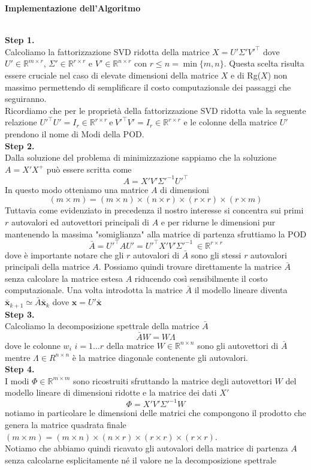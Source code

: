 \documentclass[11pt]{article}
\newcommand{\R}{\mathbb{R}} %
\begin{document}
\begin{large}{\textbf{Implementazione dell'Algoritmo}}\end{large}\\
\textbf{Step 1.}\\
Calcoliamo la fattorizzazione SVD ridotta della matrice $X=U'\Sigma' V'^\top$ dove $U' \in \R^{m \times r}$, $\Sigma' \in \R^{r \times r}$ e $V' \in \R^{n \times r}$ con $r \leq n = \min{\{m,n\}} $.  Questa scelta risulta essere cruciale  nel caso di elevate dimensioni della matrice $X$ e di Rg($X$) non massimo permettendo di semplificare il costo computazionale dei passaggi che seguiranno. \\
Ricordiamo che per le proprietà della fattorizzazione SVD ridotta vale la seguente relazione $U'^\top U' = I_r \in \R^{r \times r} \ \text{e} \ V'^\top V' = I_r \in \R^{r \times r} $ e le colonne della matrice $U'$ prendono il nome di Modi della POD. \\
\textbf{Step 2.}\\
Dalla soluzione del problema di minimizzazione sappiamo che la soluzione  $A=X'X^+$ può essere scritta come $$A=X'V'\Sigma'^{-1}U'^\top$$
In questo modo otteniamo una matrice $A$ di dimensioni $$(m \times m ) = (m \times n) \times (n \times r) \times ( r \times r) \times ( r \times m) $$Tuttavia come evidenziato in precedenza il nostro interesse si concentra sui primi $r$ autovalori ed autovettori principali di $A$ e per ridurne le dimensioni pur mantenendo la massima "somiglianza" alla matrice di partenza sfruttiamo la POD 
$$\bar{A}=U'^\top A U' = U'^\top X' V' \Sigma'^{-1} \ \in \R^{r \times r}$$
dove è importante notare che gli $r$ autovalori di $\bar{A}$ sono gli stessi $r$ autovalori principali della matrice $A$. 
Possiamo quindi trovare direttamente la matrice $\bar{A}$ senza calcolare la matrice estesa $A$ riducendo così sensibilmente il costo computazionale. Una volta introdotta la matrice $\bar{A}$ il modello lineare diventa $\mathbf{\bar{x}}_{k+1} \simeq \bar{A} \mathbf{\bar{x}}_k $ dove $\mathbf{x}=U' \mathbf{\bar{x}}$
\\
\textbf{Step 3.}\\
Calcoliamo la decomposizione spettrale della matrice $\bar{A}$  $$\bar{A} W = W \Lambda$$
dove le colonne $w_i$ $i = 1 \dots r$ della matrice $W \in \R^{n \times n}$ sono gli autovettori di $\bar{A}$ mentre $\Lambda \in R^{n \times n}$ è la matrice diagonale contenente gli autovalori.\\
\textbf{Step 4.}\\
I modi $\Phi \in \R^{m \times m}$ sono ricostruiti sfruttando la matrice degli autovettori $W$ del modello lineare di dimensioni ridotte e la matrice dei dati $X'$
$$ \Phi = X'V'\Sigma'^{-1}W $$  notiamo in particolare le dimensioni delle matrici che compongono il prodotto che genera la matrice quadrata finale 
$(m \times m) = (m \times n) \times (n \times r) \times (r \times r) \times (r \times r)$.\\
Notiamo che abbiamo quindi ricavato gli autovalori della matrice di partenza $A$ senza calcolarne esplicitamente né il valore ne la decomposizione spettrale
\end{document}
